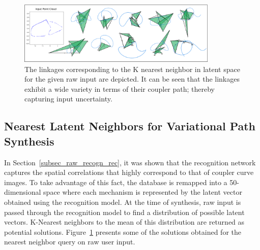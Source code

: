 \begin{figure}
\centering
\includegraphics[width=0.85\textwidth]{idetc-20/figure/fig_knn_latent.eps}
  \caption{The linkages corresponding to the K nearest neighbor in latent space for the given raw input are depicted. It can be seen that the linkages exhibit a wide variety in terms of their coupler path; thereby capturing input uncertainty.}
\label{fig_knn_latent}
\end{figure}
\subsection{Nearest Latent Neighbors for Variational Path Synthesis}

In Section~\ref{subsec_raw_recogn_rec}, it was shown that the recognition network captures the spatial correlations that highly correspond to that of coupler curve images. To take advantage of this fact, the database is remapped into a 50-dimensional space where each mechanism is represented by the latent vector obtained using the recognition model. At the time of synthesis, raw input is passed through the recognition model to find a distribution of possible latent vectors. K-Nearest neighbors to the mean of this distribution are returned as potential solutions. Figure~\ref{fig_knn_latent} presents some of the solutions obtained for the nearest neighbor query on raw user input. 



